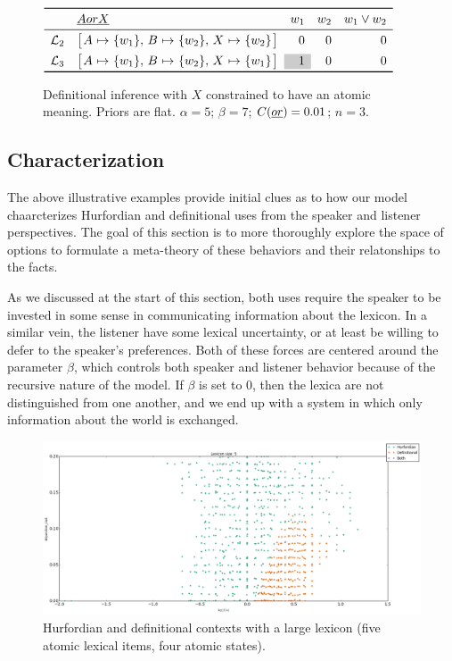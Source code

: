 \documentclass{article}
\begin{document}
\begin{figure}[tp]
  \centering
  $\begin{array}[c]{l l r r r}
    \toprule
      & \word{A or X}  & w_{1} & w_{2} & w_{1} \vee w_{2} \\
    \midrule
    \Lex_{2} & \smallhurfordlex{w_{1}}{w_{2}}{w_{2}}        & 0 & 0 & 0 \\[1ex]
    \Lex_{3} & \smallhurfordlex{w_{1}}{w_{2}}{w_{1}}        & \graycell{1} & 0 & 0\\
    \bottomrule
  \end{array}$
  \caption{Definitional inference with $X$ constrained to have an atomic meaning. 
    Priors are flat. 
    $\alpha = 5$; 
    $\beta = 7$; 
    $C(\emph{or}) = 0.01$; 
    $n = 3$.}
  \label{fig:def-focal}
\end{figure}


\subsection{Characterization}\label{sec:analysis:characterization}

The above illustrative examples provide initial clues as to how our
model chaarcterizes Hurfordian and definitional uses from the speaker
and listener perspectives. The goal of this section is to more
thoroughly explore the space of options to formulate a meta-theory of
these behaviors and their relatonships to the facts.

As we discussed at the start of this section, both uses require the
speaker to be invested in some sense in communicating information
about the lexicon.  In a similar vein, the listener have some lexical
uncertainty, or at least be willing to defer to the speaker's
preferences. Both of these forces are centered around the parameter
$\beta$, which controls both speaker and listener behavior because of
the recursive nature of the model. If $\beta$ is set to $0$, then the
lexica are not distinguished from one another, and we end up with a
system in which only information about the world is exchanged.

\begin{figure}[tp]
  \centering
  \includegraphics[width=1\textwidth]{fig/lex5-alpha-beta-gamma}
  \caption{Hurfordian and definitional contexts with a large
    lexicon (five atomic lexical items, four atomic states).} 
  \label{fig:char}
\end{figure}
\end{document}
